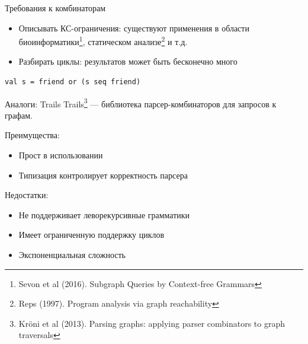 \documentclass[aspectratio=169]{beamer}
\begin{document}
\begin{frame}[fragile]{Требования к комбинаторам}
  \begin{itemize}
    \item Описывать КС-ограничения: существуют применения в области биоинформатики\footnote[1]{Sevon et al (2016). Subgraph Queries by Context-free Grammars}, статическом анализе\footnote[2]{Reps (1997). Program analysis via graph reachability} и т.д.
    \item Разбирать циклы: результатов может быть бесконечно много
  \end{itemize}
  \begin{verbatim}
val s = friend or (s seq friend)
\end{verbatim}
\end{frame}


\begin{frame}{Аналоги: Trails}
  Trails\footnote[1]{Kr\"{o}ni et al (2013). Parsing graphs: applying parser combinators to graph traversals} --- библиотека парсер-комбинаторов для запросов к графам.

    Преимущества:
          \begin{itemize}
            \item Прост в использовании
            \item Типизация контролирует корректность парсера
          \end{itemize}
    Недостатки:
          \begin{itemize}
            \item Не поддерживает леворекурсивные грамматики
            \item Имеет ограниченную поддержку циклов
            \item Экспоненциальная сложность
          \end{itemize}
\end{frame}
\end{document}
